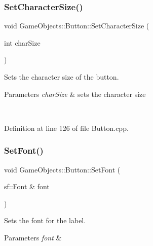 \subsubsection{\texorpdfstring{SetCharacterSize()}{SetCharacterSize()}}
{\footnotesize\ttfamily void Game\+Objects\+::\+Button\+::\+Set\+Character\+Size (\begin{DoxyParamCaption}\item[{int}]{char\+Size }\end{DoxyParamCaption})}



Sets the character size of the button. 


\begin{DoxyParams}{Parameters}
{\em char\+Size} & sets the character size \begin{DoxyVerb}\end{DoxyVerb}
 \\
\hline
\end{DoxyParams}


Definition at line 126 of file Button.\+cpp.


\begin{DoxyCode}{0}

\end{DoxyCode}
\mbox{\label{class_game_objects_1_1_button_a88a855f086cf8c46a3a575b9ad858aa9}} 
\subsubsection{\texorpdfstring{SetFont()}{SetFont()}}
{\footnotesize\ttfamily void Game\+Objects\+::\+Button\+::\+Set\+Font (\begin{DoxyParamCaption}\item[{sf\+::\+Font \&}]{font }\end{DoxyParamCaption})}



Sets the font for the label. 


\begin{DoxyParams}{Parameters}
{\em font} & \begin{DoxyVerb}\end{DoxyVerb}
 \\
\hline
\end{DoxyParams}



